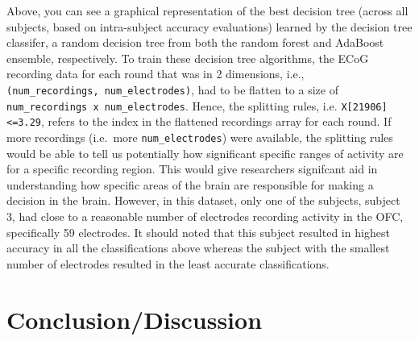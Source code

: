 \documentclass[11pt]{article}
\begin{document}
Above, you can see a graphical representation of the best decision tree
(across all subjects, based on intra-subject accuracy evaluations)
learned by the decision tree classifer, a random decision tree from both
the random forest and AdaBoost ensemble, respectively. To train these
decision tree algorithms, the ECoG recording data for each round that
was in 2 dimensions, i.e., \texttt{(num\_recordings,\ num\_electrodes)},
had to be flatten to a size of
\texttt{num\_recordings\ x\ num\_electrodes}. Hence, the splitting
rules, i.e. \texttt{X{[}21906{]}\textless{}=3.29}, refers to the index
in the flattened recordings array for each round. If more recordings
(i.e.~more \texttt{num\_electrodes}) were available, the splitting rules
would be able to tell us potentially how significant specific ranges of
activity are for a specific recording region. This would give
researchers signifcant aid in understanding how specific areas of the
brain are responsible for making a decision in the brain. However, in
this dataset, only one of the subjects, subject 3, had close to a
reasonable number of electrodes recording activity in the OFC,
specifically 59 electrodes. It should noted that this subject resulted
in highest accuracy in all the classifications above whereas the subject
with the smallest number of electrodes resulted in the least accurate
classifications.

    \hypertarget{conclusiondiscussion}{%
\section{Conclusion/Discussion}\label{conclusiondiscussion}}
\end{document}
